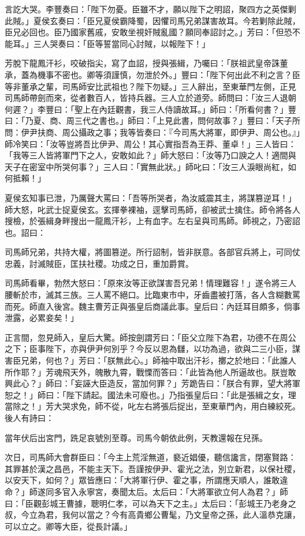 言訖大哭。李豐奏曰：「陛下勿憂。臣雖不才，願以陛下之明詔，聚四方之英傑剿此賊。」夏侯玄奏曰：「臣兄夏侯霸降蜀，因懼司馬兄弟謀害故耳。今若剿除此賊，臣兄必回也。臣乃國家舊戚，安敢坐視奸賊亂國？願同奉詔討之。」芳曰：「但恐不能耳。」三人哭奏曰：「臣等誓當同心討賊，以報陛下！」

芳脫下龍鳳汗衫，咬破指尖，寫了血詔，授與張緝，乃囑曰：「朕祖武皇帝誅董承，蓋為機事不密也。卿等須謹慎，勿泄於外。」豐曰：「陛下何出此不利之言？臣等非董承之輩，司馬師安比武祖也？陛下勿疑。」三人辭出，至東華門左側，正見司馬師帶劍而來，從者數百人，皆持兵器。三人立於道旁。師問曰：「汝三人退朝何遲？」李豐曰：「聖上在內廷觀書，我三人侍讀故耳。」師曰：「所看何書？」豐曰：「乃夏、商、周三代之書也。」師曰：「上見此書，問何故事？」豐曰：「天子所問：伊尹扶商、周公攝政之事；我等皆奏曰：『今司馬大將軍，即伊尹、周公也。』」師冷笑曰：「汝等豈將吾比伊尹、周公！其心實指吾為王莽、董卓！」三人皆曰：「我等三人皆將軍門下之人，安敢如此？」師大怒曰：「汝等乃口諛之人！適間與天子在密室中所哭何事？」三人曰：「實無此狀。」師叱曰：「汝三人淚眼尚紅，如何抵賴！」

夏侯玄知事已泄，乃厲聲大罵曰：「吾等所哭者，為汝威震其主，將謀篡逆耳！」師大怒，叱武士捉夏侯玄。玄揮拳裸袖，逕擊司馬師，卻被武士擒住。師令將各人搜檢，於張緝身畔搜出一龍鳳汗衫，上有血字。左右呈與司馬師。師視之，乃密詔也。詔曰：

司馬師兄弟，共持大權，將圖篡逆。所行詔制，皆非朕意。各部官兵將上，可同仗忠義，討滅賊臣，匡扶社稷。功成之日，重加爵賞。

司馬師看畢，勃然大怒曰：「原來汝等正欲謀害吾兄弟！情理難容！」遂令將三人腰斬於市，滅其三族。三人罵不絕口。比臨東市中，牙齒盡被打落，各人含糊數罵而死。師直入後宮。魏主曹芳正與張皇后商議此事。皇后曰：內廷耳目頗多，倘事泄露，必累妾矣！」

正言間，忽見師入，皇后大驚。師按劍謂芳曰：「臣父立陛下為君，功德不在周公之下；臣事陛下，亦與伊尹何別乎？今反以恩為讎，以功為過，欲與二三小臣，謀害臣兄弟，何也？」芳曰：「朕無此心。」師袖中取出汗衫，擲之於地曰：「此誰人所作耶？」芳魂飛天外，魄散九霄，戰慄而答曰：「此皆為他人所逼故也。朕豈敢興此心？」師曰：「妄誣大臣造反，當加何罪？」芳跪告曰：「朕合有罪，望大將軍恕之！」師曰：「陛下請起。國法未可廢也。」乃指張皇后曰：「此是張緝之女，理當除之！」芳大哭求免，師不從，叱左右將張后捉出，至東華門內，用白練絞死。後人有詩曰：

當年伏后出宮門，跣足哀號別至尊。司馬今朝依此例，天教還報在兒孫。

次日，司馬師大會群臣曰：「今主上荒淫無道，褻近娼優，聽信讒言，閉塞賢路：其罪甚於漢之昌邑，不能主天下。吾謹按伊尹、霍光之法，別立新君，以保社稷，以安天下，如何？」眾皆應曰：「大將軍行伊、霍之事，所謂應天順人，誰敢違命？」師遂同多官入永寧宮，奏聞太后。太后曰：「大將軍欲立何人為君？」師曰：「臣觀彭城王曹據，聰明仁孝，可以為天下之主。」太后曰：「彭城王乃老身之叔，今立為君，我何以當之？今有高貴鄉公曹髦，乃文皇帝之孫，此人溫恭克讓，可以立之。卿等大臣，從長計議。」

